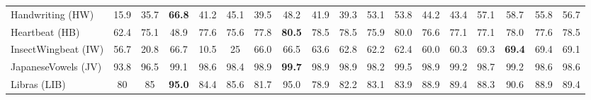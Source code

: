 \documentclass[journal]{IEEEtran}
\begin{document}
\begin{table*}[!t]
\begin{tabular}{l|c|c|c|c|c|cccc|cccc|cccc|}
Handwriting (HW) & 15.9  & 35.7  & \textbf{66.8} & 41.2  & 45.1  & \textcolor[rgb]{ 1,  0,  0}{39.5} & \textcolor[rgb]{ .188,  .329,  .588}{48.2} & \textcolor[rgb]{ .188,  .329,  .588}{41.9} & 39.3  & \textcolor[rgb]{ 1,  0,  0}{53.1} & \textcolor[rgb]{ .776,  .349,  .067}{53.8} & 44.2  & 43.4  & \textcolor[rgb]{ 1,  0,  0}{57.1} & \textcolor[rgb]{ .439,  .678,  .278}{58.7} & 55.8  & 56.7 \\
Heartbeat (HB) & 62.4  & 75.1  & 48.9  & 77.6  & 75.6  & \textcolor[rgb]{ 1,  0,  0}{77.8} & \textcolor[rgb]{ .188,  .329,  .588}{\textbf{80.5}} & \textcolor[rgb]{ .188,  .329,  .588}{78.5} & \textcolor[rgb]{ .188,  .329,  .588}{78.5} & \textcolor[rgb]{ 1,  0,  0}{75.9} & \textcolor[rgb]{ .776,  .349,  .067}{80.0} & \textcolor[rgb]{ .776,  .349,  .067}{76.6} & \textcolor[rgb]{ .776,  .349,  .067}{77.1} & \textcolor[rgb]{ 1,  0,  0}{77.1} & \textcolor[rgb]{ .439,  .678,  .278}{78.0} & \textcolor[rgb]{ .439,  .678,  .278}{77.6} & \textcolor[rgb]{ .439,  .678,  .278}{78.5} \\
InsectWingbeat (IW) & 56.7  & 20.8  & 66.7  & 10.5  & 25    & \textcolor[rgb]{ 1,  0,  0}{66.0} & \textcolor[rgb]{ .188,  .329,  .588}{66.5} & 63.6  & 62.8  & \textcolor[rgb]{ 1,  0,  0}{62.2} & \textcolor[rgb]{ .776,  .349,  .067}{62.4} & 60.0  & 60.3  & \textcolor[rgb]{ 1,  0,  0}{69.3} & \textcolor[rgb]{ .439,  .678,  .278}{\textbf{69.4}} & \textcolor[rgb]{ .439,  .678,  .278}{69.4} & 69.1 \\
JapaneseVowels (JV) & 93.8  & 96.5  & 99.1  & 98.6  & 98.4  & \textcolor[rgb]{ 1,  0,  0}{98.9} & \textcolor[rgb]{ .188,  .329,  .588}{\textbf{99.7}} & \textcolor[rgb]{ .188,  .329,  .588}{98.9} & \textcolor[rgb]{ .188,  .329,  .588}{98.9} & \textcolor[rgb]{ 1,  0,  0}{98.2} & \textcolor[rgb]{ .776,  .349,  .067}{99.5} & \textcolor[rgb]{ .776,  .349,  .067}{98.9} & \textcolor[rgb]{ .776,  .349,  .067}{99.2} & \textcolor[rgb]{ 1,  0,  0}{98.7} & \textcolor[rgb]{ .439,  .678,  .278}{99.2} & 98.6  & 98.6 \\
Libras (LIB) & 80    & 85    & \textbf{95.0} & 84.4  & 85.6  & \textcolor[rgb]{ 1,  0,  0}{81.7} & \textcolor[rgb]{ .188,  .329,  .588}{95.0} & 78.9  & \textcolor[rgb]{ .188,  .329,  .588}{82.2} & \textcolor[rgb]{ 1,  0,  0}{83.1} & \textcolor[rgb]{ .776,  .349,  .067}{83.9} & \textcolor[rgb]{ .776,  .349,  .067}{88.9} & \textcolor[rgb]{ .776,  .349,  .067}{89.4} & \textcolor[rgb]{ 1,  0,  0}{88.3} & \textcolor[rgb]{ .439,  .678,  .278}{90.6} & \textcolor[rgb]{ .439,  .678,  .278}{88.9} & \textcolor[rgb]{ .439,  .678,  .278}{89.4} \\

\end{tabular}
\end{table*}
\end{document}
